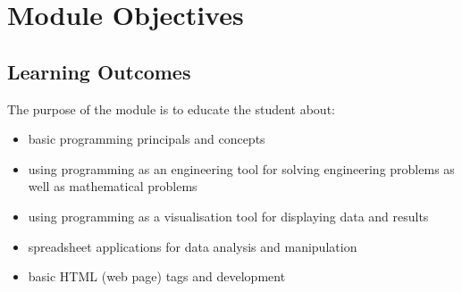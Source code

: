 \section{Module Objectives}
    \subsection{Learning Outcomes}
        The purpose of the module is to educate the student about:
        \begin{itemize}
            \item basic programming principals and concepts
            \item using programming as an engineering tool for solving engineering problems 
                  as well as mathematical problems
            \item using programming as a visualisation tool for displaying data
                  and results
            \item spreadsheet applications for data analysis and manipulation
            \item basic HTML (web page) tags and development
        \end{itemize}
        
